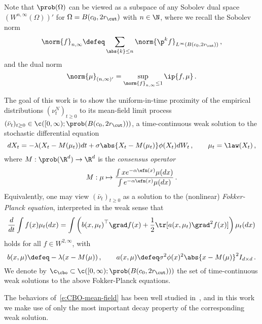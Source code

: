 \documentclass{amsart}
\begin{document}
Note that $\prob(\Omega)$ can be viewed as a subspace of any Sobolev dual space $(W^{n,\infty}(\Omega))'$ for $\Omega = B(c_0, 2r_\cut)$ with $n \in \N$, where we recall the Sobolev norm 
\begin{equation*}
	\norm{f}_{n,\infty} \defeq \sum_{\abs{k} \le n} \norm{\p^k f}_{L^\infty(B(c_0, 2r_\cut))} \,,
\end{equation*}
and the dual norm 
\begin{equation*}
	\norm{\mu}_{(n,\infty)'} = \sup_{\norm{f}_{n,\infty} \le 1} \ip{f, \mu} \,.
\end{equation*}

The goal of this work is to show the uniform-in-time proximity of the empirical distributions $(\nu^N_t)_{t \ge 0}$ to its mean-field limit process $(\bar \nu_t)_{t \ge 0} \in \c([0,\infty); \prob(B(c_0, 2r_\cut)))$, a time-continuous weak solution to the stochastic differential equation  
\begin{equation}
	\label{e:CBO-mean-field}
	d X_t = -\lambda (X_t - M(\mu_t)) dt + \sigma \abs{X_t - M(\mu_t)} \phi(X_t) d W_t \,, \qquad \mu_t = \law(X_t) \,,
\end{equation}
where $M: \prob(\R^d) \to \R^d$ is the \emph{consensus operator}
\begin{equation*}
	M: \mu \mapsto \frac{\int x e^{-\alpha \efn(x)} \mu(dx)}{\int e^{-\alpha \efn(x)} \mu(dx)} \,.
\end{equation*}
Equivalently, one may view $(\bar \nu_t)_{t \ge 0}$ as a solution to the (nonlinear) \emph{Fokker-Planck equation}, interpreted in the weak sense that
\begin{equation}
	\label{e:CBO-fokker-planck}
	\frac{d}{dt} \int f(x) \mu_t(dx) = \int \left( {b(x,\mu_t)}^\top \grad f(x) + \frac{1}{2} \tr [a(x, \mu_t) \grad^2 f(x)] \right) \mu_t(dx) 
\end{equation}
holds for all $f \in W^{2,\infty}$, with 
\begin{equation*}
	b(x, \mu) \defeq -\lambda(x - M(\mu)) \,, \qquad a(x, \mu) \defeq \sigma^2 \phi(x)^2 \abs{x-M(\mu)}^2 I_{d \times d} \,.
\end{equation*}
We denote by $\c_\cbo \subset \c([0,\infty); \prob(B(c_0, 2r_\cut)))$ the set of time-continuous weak solutions to the above Fokker-Planck equations. 

The behaviors of~\eqref{e:CBO-mean-field} has been well studied in~\cite{CarriloChoiTotzeckTse2018,FornasierKlockRiedl2021}, and in this work we make use of only the most important decay property of the corresponding weak solution. 
\end{document}
